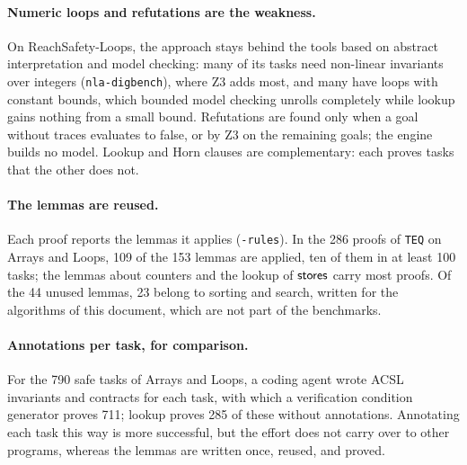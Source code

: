 \paragraph{Numeric loops and refutations are the weakness.} On ReachSafety-Loops, the approach stays behind the tools
based on abstract interpretation and model checking: many of its tasks need non-linear invariants over integers
(\texttt{nla-digbench}), where Z3 adds most, and many have loops with constant bounds, which bounded model checking
unrolls completely while lookup gains nothing from a small bound. Refutations are found only when a goal without
traces evaluates to false, or by Z3 on the remaining goals; the engine builds no model. Lookup and Horn clauses are
complementary: each proves tasks that the other does not.

\paragraph{The lemmas are reused.} Each proof reports the lemmas it applies (\texttt{-rules}). In the 286 proofs of
\texttt{TEQ} on Arrays and Loops, 109 of the 153 lemmas are applied, ten of them in at least 100 tasks; the lemmas
about counters and the lookup of $\mathsf{stores}$ carry most proofs. Of the 44 unused lemmas, 23 belong to sorting and search,
written for the algorithms of this document, which are not part of the benchmarks.

\paragraph{Annotations per task, for comparison.} For the 790 safe tasks of Arrays and Loops, a coding agent wrote ACSL
invariants and contracts for each task, with which a verification condition generator proves 711; lookup proves 285 of
these without annotations. Annotating each task this way is more successful, but the effort does not carry over to
other programs, whereas the lemmas are written once, reused, and proved.
